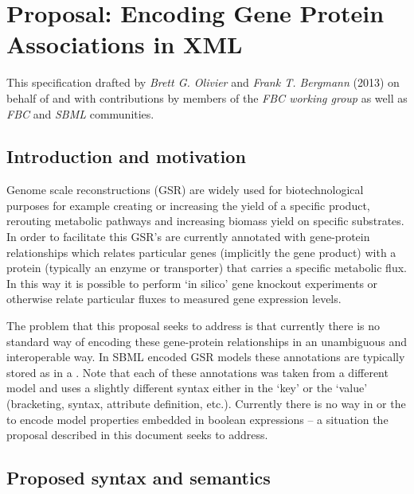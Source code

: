 
\section{Proposal: Encoding Gene Protein Associations in XML}
\label{apdx-gene_association}

This specification drafted by \emph{Brett G. Olivier} and \emph{Frank T. Bergmann} (2013) on behalf of and with contributions by members of the \emph{FBC working group} as well as \emph{FBC} and \emph{SBML} communities.

\subsection{ Introduction and motivation }
\label{intro-ga}

Genome scale reconstructions (GSR) are widely used for biotechnological purposes for example creating or increasing the yield of a specific product, rerouting metabolic pathways and increasing biomass yield on specific substrates. In order to facilitate this GSR's are currently annotated with gene-protein relationships which relates particular genes (implicitly the gene product) with a protein (typically an enzyme or transporter) that carries a specific metabolic flux. In this way it is possible to perform `in silico' gene knockout experiments or otherwise relate particular fluxes to measured gene expression levels.

The problem that this proposal seeks to address is that currently there is no standard way of encoding these gene-protein relationships in an unambiguous and interoperable way. In SBML encoded GSR models these annotations are typically stored as \Notes in a \Reaction.
%
Note that each of these annotations was taken from a different model and uses a slightly different syntax either in the `key' or the `value' (bracketing, syntax, attribute definition, etc.). Currently there is no way in \sbmlthreecore or the \FBCPackage to encode model properties embedded in boolean expressions -- a situation the proposal described in this document seeks to address.

\pagebreak
\subsection{Proposed syntax and semantics}
\label{syntax-ga}

